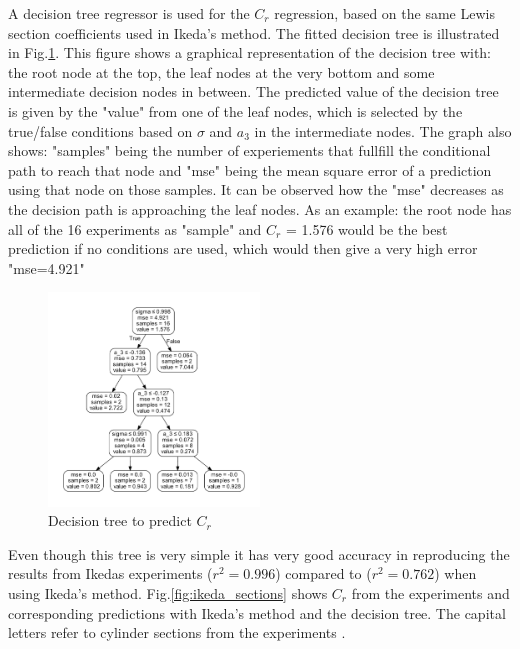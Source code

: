 A decision tree regressor is used for the $C_r$ regression, based on
the same Lewis section coefficients used in Ikeda's method. The fitted
decision tree is illustrated in Fig.\ref{fig:decision_tree}.
This figure shows a graphical representation of the decision tree with:
the root node at the top, the leaf nodes at the very bottom and some
intermediate decision nodes in between. The predicted value of the
decision tree is given by the "value" from one of the leaf nodes, which
is selected by the true/false conditions based on $\sigma$ and $a_3$
in the intermediate nodes. The graph also shows: "samples" being the
number of experiements that fullfill the conditional path to reach that
node and "mse" being the mean square error of a prediction using that
node on those samples. It can be observed how the "mse" decreases as the
decision path is approaching the leaf nodes. As an example: the root
node has all of the 16 experiments as "sample" and $C_r$ = 1.576 would
be the best prediction if no conditions are used, which would then give
a very high error "mse=4.921"
\begin{figure}[H]
\begin{center}\includegraphics[width = 0.5\textwidth]{figures/decision_tree.pdf}\end{center}
\vspace{-1cm}
\caption{Decision tree to predict $C_r$}
\label{fig:decision_tree}
\end{figure}
Even though this tree is very simple it has very good accuracy in
reproducing the results from Ikedas experiments ($r^2=0.996$) compared
to ($r^2=0.762$) when using Ikeda's method.
Fig.\ref{fig:ikeda_sections} shows $C_r$ from the experiments
and corresponding predictions with Ikeda's method and the decision tree.
The capital letters refer to cylinder sections from the experiments
\citep{7505983/4AFVVGNT}.
